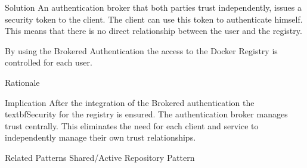 \begin{patdescription}
\item[Solution] 
An authentication broker that both parties trust independently, issues a security token to the client. The client can use this token to authenticate himself. This means that there is no direct relationship between the user and the registry.

By using the Brokered Authentication the access to the Docker Registry is controlled for each user.


\item[Rationale] 

\item[Implication] After the integration of the Brokered authentication the textbf{Security} for the registry is ensured. %
The authentication broker manages trust centrally. This eliminates the need for each client and service to independently manage their own trust relationships.

\item [Related Patterns]
Shared/Active Repository Pattern

\end{patdescription}

